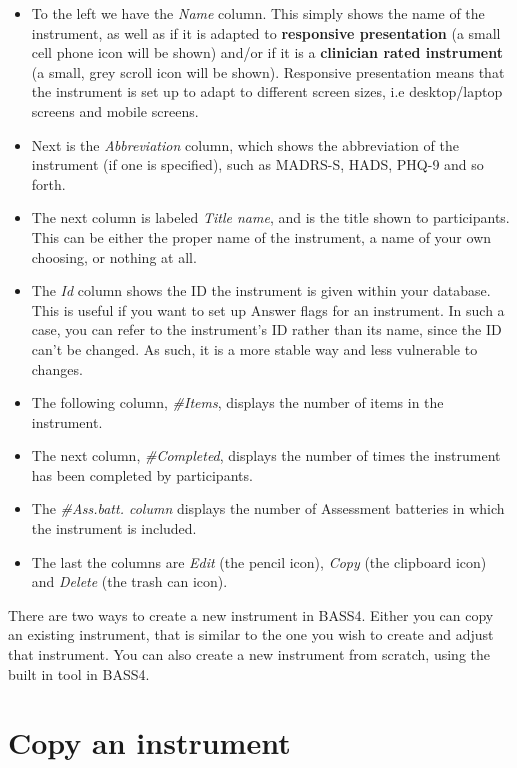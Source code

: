 \documentclass[
]{book}
\providecommand{\tightlist}{%
  \setlength{\itemsep}{0pt}\setlength{\parskip}{0pt}}
\begin{document}
\begin{itemize}
\tightlist
\item
  To the left we have the \emph{Name} column. This simply shows the name of the instrument, as well as if it is adapted to \textbf{responsive presentation} (a small cell phone icon will be shown) and/or if it is a \textbf{clinician rated instrument} (a small, grey scroll icon will be shown). Responsive presentation means that the instrument is set up to adapt to different screen sizes, i.e desktop/laptop screens and mobile screens.
\item
  Next is the \emph{Abbreviation} column, which shows the abbreviation of the instrument (if one is specified), such as MADRS-S, HADS, PHQ-9 and so forth.
\item
  The next column is labeled \emph{Title name}, and is the title shown to participants. This can be either the proper name of the instrument, a name of your own choosing, or nothing at all.
\item
  The \emph{Id} column shows the ID the instrument is given within your database. This is useful if you want to set up Answer flags for an instrument. In such a case, you can refer to the instrument's ID rather than its name, since the ID can't be changed. As such, it is a more stable way and less vulnerable to changes.
\item
  The following column, \emph{\#Items}, displays the number of items in the instrument.
\item
  The next column, \emph{\#Completed}, displays the number of times the instrument has been completed by participants.
\item
  The \emph{\#Ass.batt. column} displays the number of Assessment batteries in which the instrument is included.
\item
  The last the columns are \emph{Edit} (the pencil icon), \emph{Copy} (the clipboard icon) and \emph{Delete} (the trash can icon).
\end{itemize}

There are two ways to create a new instrument in BASS4. Either you can copy an existing instrument, that is similar to the one you wish to create and adjust that instrument. You can also create a new instrument from scratch, using the built in tool in BASS4.

\section{Copy an instrument}\label{copy-an-instrument}
\end{document}
